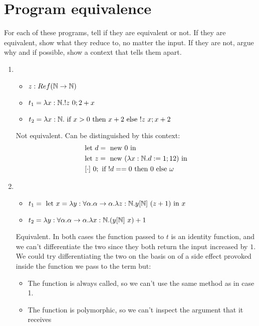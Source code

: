 \documentclass{article}
\begin{document}
\section{Program equivalence}
For each of these programs, tell if they are equivalent or not. If they are equivalent, show what they reduce to, no matter the input. If they are not, argue why and if possible, show a context that tells them apart.
\begin{enumerate}
    \item
        \begin{itemize}
            \item $z:Ref(\mathbb N\to\mathbb N)$
            \item $t_1=\lam{x:\N}{!z\ 0;2+x}$
            \item $t_2=\lam{x:\N}{\IF x>0 \THEN x+2 \ELSE !z\ x;x+2}$
        \end{itemize}
        Not equivalent. Can be distinguished by this context:
        \begin{align*}
            & \LET d = \NEW 0 \TIN\\
            & \LET z = \NEW(\lam{x:\N}{d:=1;12}) \TIN\\
            &\ [\cdot]\ 0; \IF !d == 0 \THEN 0 \ELSE \omega
        \end{align*}

    \item 
        \begin{itemize}
            \item $t_1= \LET x=\lam{y:\forall\alpha.\alpha\to\alpha}\lam{z:\N}{y[\N]\ (z+1)} \TIN x$
            \item $t_2= \lam{y:\forall\alpha.\alpha\to\alpha}\lam{x:\N}{(y[\N]\ x)+1}$
        \end{itemize}
        Equivalent. In both cases the function passed to $t$ is an identity function, and we can't differentiate the two since they both return the input increased by $1$. \\
        We could try differentiating the two on the basis on of a side effect provoked inside the function we pass to the term but:
        \begin{itemize}
            \item The function is always called, so we can't use the same method as in case 1.
            \item The function is polymorphic, so we can't inspect the argument that it receives
        \end{itemize}


\end{enumerate}
\end{document}
